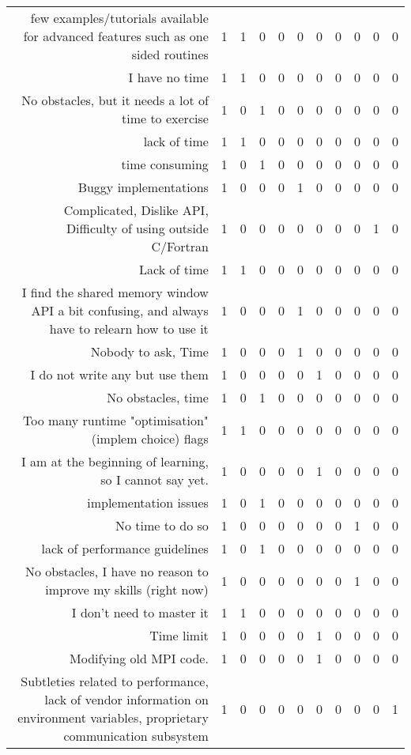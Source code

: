 {\begin{landscape}
\begin{longtable}[htb]{r|c|c|c|c|c|c|c|c|c|c}
{few examples/tutorials available for advanced features such as one sided routines} & 1 & 1 & 0 & 0 & 0 & 0 & 0 & 0 & 0 & 0 \\%
{I have no time} & 1 & 1 & 0 & 0 & 0 & 0 & 0 & 0 & 0 & 0 \\%
{No obstacles, but it needs a lot of time to exercise} & 1 & 0 & 1 & 0 & 0 & 0 & 0 & 0 & 0 & 0 \\%
{lack of time} & 1 & 1 & 0 & 0 & 0 & 0 & 0 & 0 & 0 & 0 \\%
{time consuming} & 1 & 0 & 1 & 0 & 0 & 0 & 0 & 0 & 0 & 0 \\%
{Buggy implementations} & 1 & 0 & 0 & 0 & 1 & 0 & 0 & 0 & 0 & 0 \\%
{Complicated, Dislike API, Difficulty of using outside C/Fortran} & 1 & 0 & 0 & 0 & 0 & 0 & 0 & 0 & 1 & 0 \\%
{Lack of time} & 1 & 1 & 0 & 0 & 0 & 0 & 0 & 0 & 0 & 0 \\%
{I find the shared memory window API a bit confusing, and always have to relearn how to use it} & 1 & 0 & 0 & 0 & 1 & 0 & 0 & 0 & 0 & 0 \\%
{Nobody to ask, Time} & 1 & 0 & 0 & 0 & 1 & 0 & 0 & 0 & 0 & 0 \\%
{I do not write any but use them} & 1 & 0 & 0 & 0 & 0 & 1 & 0 & 0 & 0 & 0 \\%
{No obstacles, time} & 1 & 0 & 1 & 0 & 0 & 0 & 0 & 0 & 0 & 0 \\%
{Too many runtime "optimisation" (implem choice) flags} & 1 & 1 & 0 & 0 & 0 & 0 & 0 & 0 & 0 & 0 \\%
{I am at the beginning of learning, so I cannot say yet.} & 1 & 0 & 0 & 0 & 0 & 1 & 0 & 0 & 0 & 0 \\%
{implementation issues} & 1 & 0 & 1 & 0 & 0 & 0 & 0 & 0 & 0 & 0 \\%
{No time to do so} & 1 & 0 & 0 & 0 & 0 & 0 & 0 & 1 & 0 & 0 \\%
{lack of performance guidelines} & 1 & 0 & 1 & 0 & 0 & 0 & 0 & 0 & 0 & 0 \\%
{No obstacles, I have no reason to improve my skills (right now)} & 1 & 0 & 0 & 0 & 0 & 0 & 0 & 1 & 0 & 0 \\%
{I don't need to master it} & 1 & 1 & 0 & 0 & 0 & 0 & 0 & 0 & 0 & 0 \\%
{Time limit} & 1 & 0 & 0 & 0 & 0 & 1 & 0 & 0 & 0 & 0 \\%
{Modifying old MPI code.} & 1 & 0 & 0 & 0 & 0 & 1 & 0 & 0 & 0 & 0 \\%
{Subtleties related to performance, lack of vendor information on environment variables, proprietary communication subsystem} & 1 & 0 & 0 & 0 & 0 & 0 & 0 & 0 & 0 & 1 \\%

\end{longtable}
\end{landscape}}
